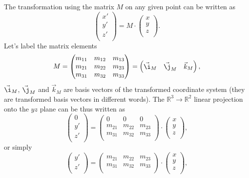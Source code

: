 \documentclass[11pt,a4paper]{article}
\begin{document}
The transformation using the matrix $ M $ on any given point can be written as
\begin{equation}
\begin{pmatrix}
x' \\
y' \\
z' \\
\end{pmatrix}
= M\cdot
\begin{pmatrix}
x \\
y \\
z \\
\end{pmatrix}.
\end{equation}
Let's label the matrix elements
\begin{equation}
M=
\begin{pmatrix}
m_{11} & m_{12} & m_{13} \\
m_{21} & m_{22} & m_{23} \\
m_{31} & m_{32} & m_{33} \\
\end{pmatrix}
=
\begin{pmatrix}
\vec{\i}_{M} & \vec{\j}_{M} & \vec{k}_{M}
\end{pmatrix},
\end{equation}
$\vec{\i}_{M}$, $\vec{\j}_{M}$ and $\vec{k}_{M}$ are basis vectors of the transformed coordinate system (they are transformed basis vectors in different words). The $ \mathbb{R}^{3}\rightarrow\mathbb{R}^{2} $ linear projection onto the $ yz $ plane can be thus written as
\begin{equation}
\begin{pmatrix}
0 \\
y' \\
z' \\
\end{pmatrix}
=
\begin{pmatrix}
0 & 0 & 0 \\
m_{21} & m_{22} & m_{23} \\
m_{31} & m_{32} & m_{33} \\
\end{pmatrix}
\cdot
\begin{pmatrix}
x \\
y \\
z \\
\end{pmatrix},
\end{equation}
or simply
\begin{equation}
\begin{pmatrix}
y' \\
z' \\
\end{pmatrix}
=
\begin{pmatrix}
m_{21} & m_{22} & m_{23} \\
m_{31} & m_{32} & m_{33} \\
\end{pmatrix}
\cdot
\begin{pmatrix}
x \\
y \\
z \\
\end{pmatrix},
\end{equation}
\end{document}
